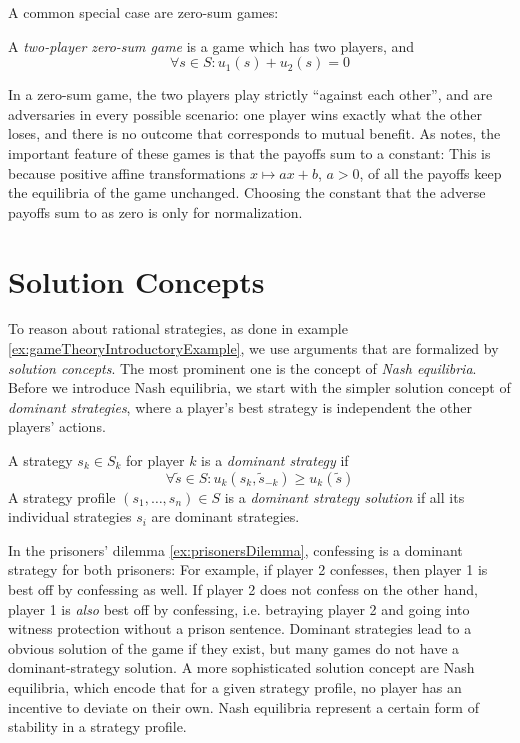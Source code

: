 \documentclass[a4paper]{scrreprt}
\begin{document}
    A common special case are zero-sum games:
    
    \begin{defn}
        A \emph{two-player zero-sum game} is a game which has two players, and 
        \[ \forall s \in S: u_1(s) + u_2(s) = 0 \]
    \end{defn}

    In a zero-sum game, the two players play strictly “against each other”, and are adversaries in every possible scenario:
    one player wins exactly what the other loses, and there is no outcome that corresponds to mutual benefit. As \cite{bib:fudenbergGameTheory} notes, the important feature of these games is that the payoffs sum to a constant: 
    This is because positive affine transformations $x \mapsto ax + b$, $a > 0$, of all the payoffs keep the equilibria of the game unchanged.
    Choosing the constant that the adverse payoffs sum to as zero is only for normalization.
    
    \section{Solution Concepts}
    To reason about rational strategies, as done in example \ref{ex:gameTheoryIntroductoryExample}, we use arguments that are formalized by \emph{solution concepts}.
    The most prominent one is the concept of \emph{Nash equilibria}.
    Before we introduce Nash equilibria, we start with the simpler solution concept of \emph{dominant strategies}, where a player's best strategy is independent the other players' actions.
    
    \begin{defn}
        A strategy $s_k \in S_k$ for player $k$ is a \emph{dominant strategy} if 
        \[ \forall \tilde{s} \in S: u_k(s_k, \tilde{s}_{-k}) \geq u_k(\tilde{s}) \]
        A strategy profile $(s_1, \dots, s_n) \in S$ is a \emph{dominant strategy solution} if all its individual strategies $s_i$ are dominant strategies.
    \end{defn}
    
    In the prisoners' dilemma \ref{ex:prisonersDilemma}, confessing is a dominant strategy for both prisoners:
    For example, if player 2 confesses, then player 1 is best off by confessing as well. If player 2 does not confess on the other hand, player 1 is \emph{also} best off by confessing, i.e. betraying player 2 and going into witness protection without a prison sentence.
    Dominant strategies lead to a obvious solution of the game if they exist, but many games do not have a dominant-strategy solution.
    A more sophisticated solution concept are Nash equilibria, which encode that for a given strategy profile, no player has an incentive to deviate on their own. Nash equilibria represent a certain form of stability in a strategy profile.
    
\end{document}
